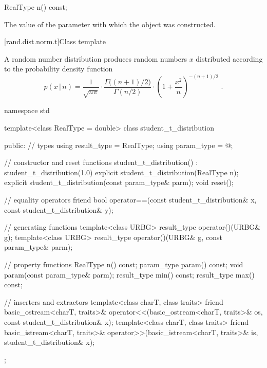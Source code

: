 %
\begin{itemdecl}
RealType n() const;
\end{itemdecl}

\begin{itemdescr}
\pnum
\returns
The value of the  parameter
 with which the object was constructed.
\end{itemdescr}


[rand.dist.norm.t]{Class template }%
%

\pnum
A  random number distribution
produces random numbers $x$
distributed according to
the probability density function%
\[ p(x\,|\,n) = \frac{1}{\sqrt{n \pi}}
     \cdot \frac{\Gamma\big((n+1)/2\big)}{\Gamma(n/2)}
     \cdot \left(1 + \frac{x^2}{n} \right)^{-(n+1)/2}
     \text{ .} \]

%
%
\begin{codeblock}
namespace std {
  template<class RealType = double>
  class student_t_distribution {
  public:
    // types
    using result_type = RealType;
    using param_type  = @\unspec@;

    // constructor and reset functions
    student_t_distribution() : student_t_distribution(1.0) {}
    explicit student_t_distribution(RealType n);
    explicit student_t_distribution(const param_type& parm);
    void reset();

    // equality operators
    friend bool operator==(const student_t_distribution& x, const student_t_distribution& y);

    // generating functions
    template<class URBG>
      result_type operator()(URBG& g);
    template<class URBG>
      result_type operator()(URBG& g, const param_type& parm);

    // property functions
    RealType n() const;
    param_type param() const;
    void param(const param_type& parm);
    result_type min() const;
    result_type max() const;

    // inserters and extractors
    template<class charT, class traits>
      friend basic_ostream<charT, traits>&
        operator<<(basic_ostream<charT, traits>& os, const student_t_distribution& x);
    template<class charT, class traits>
      friend basic_istream<charT, traits>&
        operator>>(basic_istream<charT, traits>& is, student_t_distribution& x);
  };
}
\end{codeblock}


